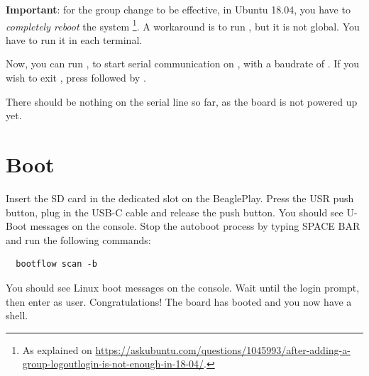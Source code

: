 
{\bf Important}: for the group change to be effective, in Ubuntu 18.04, you have to
{\em completely reboot} the system \footnote{As explained on
\url{https://askubuntu.com/questions/1045993/after-adding-a-group-logoutlogin-is-not-enough-in-18-04/}.}.
A workaround is to run , but it is not global.
You have to run it in each terminal.

Now, you can run , to start serial
communication on , with a baudrate of . If
you wish to exit , press \code{[Ctrl][a]} followed by
\code{[Ctrl][x]}.

There should be nothing on the serial line so far, as the board is not
powered up yet.

\section{Boot}

Insert the SD card in the dedicated slot on the BeaglePlay. Press the USR
push button, plug in the USB-C cable and
release the push button. You should see U-Boot messages on the console.
Stop the autoboot process by typing SPACE BAR and run the following commands:

\begin{verbatim}
  bootflow scan -b
\end{verbatim}

You should see Linux boot messages on the console.
Wait until the login prompt, then enter  as user.
Congratulations! The board has booted and you now have a shell.

